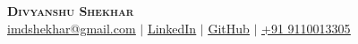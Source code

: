 \documentclass[letterpaper,11pt]{article}
\makeatletter
\newcommand{\resumeItem}[1]{
  \item\small{
    {#1 \vspace{-2pt}}
  }
}
\newcommand{\resumeSubheading}[4]{
  \vspace{-2pt}\item
    \begin{tabular*}{0.97\textwidth}[t]{l@{\extracolsep{\fill}}r}
      \textbf{#1} & #2 \\
      \textit{\small#3} & \textit{\small #4} \\
    \end{tabular*}\vspace{-7pt}
}
\newcommand{\resumeSubSubheading}[2]{
    \item
    \begin{tabular*}{0.97\textwidth}{l@{\extracolsep{\fill}}r}
      \textit{\small#1} & \textit{\small #2} \\
    \end{tabular*}\vspace{-7pt}
}
\newcommand{\resumeSubHeadingListStart}{\begin{itemize}[leftmargin=0.15in, label={}]}
\newcommand{\resumeSubHeadingListEnd}{\end{itemize}}
\newcommand{\resumeItemListStart}{\begin{itemize}}
\newcommand{\resumeItemListEnd}{\end{itemize}\vspace{-5pt}}
\makeatother
\begin{document}

\begin{center}
    \textbf{\Huge \scshape Divyanshu Shekhar} \\ \vspace{1pt}
    \href{mailto:imdshekhar@gmail.com}{ \underline{imdshekhar@gmail.com}} $|$  
    \href{https://linkedin.com/in/dshekhar17}{ \underline{LinkedIn}} $|$
    \href{https://github.com/divshekhar}{ \underline{GitHub}} $|$
    \href{tel:+919110013305} { \underline{+91 9110013305}}
    
\end{center}


        
    
       
\end{document}
